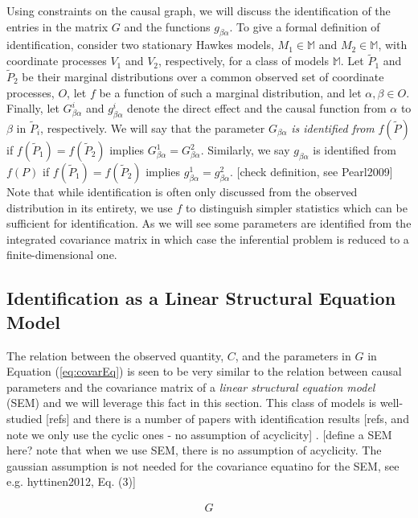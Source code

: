 \documentclass[accepted]{uai2021} %
\begin{document}
Using constraints on the causal graph, we will discuss the identification of 
the entries in the 
matrix $G$ and the functions $g_{\beta\alpha}$. To give a formal definition of 
identification, consider two stationary Hawkes 
models, $M_1\in\mathbb{M}$ and $M_2\in\mathbb{M}$, with coordinate processes 
$V_1$ and $V_2$, 
respectively, for a class of models $\mathbb{M}$. Let $ \tilde{P}_1$ and $ 
\tilde{P}_2$ be their marginal 
distributions over a common observed set of 
coordinate processes, $O$, let $f$ be a function of 
such a marginal distribution, and let 
$\alpha,\beta\in O$. Finally, let $G_{\beta\alpha}^i$ and $g_{\beta\alpha}^i$ 
denote the direct effect and the causal function from $\alpha$ to 
$\beta$ in $\tilde{P}_i$, respectively. We will say that the parameter 
$G_{\beta\alpha}$ \emph{is 
identified from} 
$f(\tilde{P})$ if $f(\tilde{P}_1) = f(\tilde{P}_2)$ 
implies $G_{\beta\alpha}^1 = G_{\beta\alpha}^2$. Similarly, we say 
$g_{\beta\alpha}$ is identified from $f(P)$ if $f(\tilde{P}_1) = 
f(\tilde{P}_2)$ 
implies $g_{\beta\alpha}^1 = g_{\beta\alpha}^2$. [check definition, see 
Pearl2009] Note that while identification is often only discussed from the 
observed distribution in its entirety, we use $f$ to distinguish simpler 
statistics which can be sufficient for identification. As we will see some 
parameters are identified from the integrated covariance matrix in which case 
the inferential problem is reduced to a finite-dimensional one.


\subsection{Identification as a Linear Structural Equation Model}

The relation between the observed quantity, $C$, and the parameters in $G$ in 
Equation (\ref{eq:covarEq}) is seen to be very similar to the relation between 
causal parameters and the covariance matrix of a \emph{linear structural 
equation model} (SEM) and we will leverage this fact in this section. This 
class of models is well-studied [refs] and there is a number of papers with 
identification results [refs, and note we only use the cyclic ones - no 
assumption of acyclicity] . [define a SEM here? note that when we use SEM, 
there is no assumption of acyclicity. The gaussian assumption is not needed for 
the covariance equatino for the SEM, see e.g. hyttinen2012, Eq. (3)]

\begin{align}
	G
	\label{eq:SEM}
\end{align}
\end{document}
